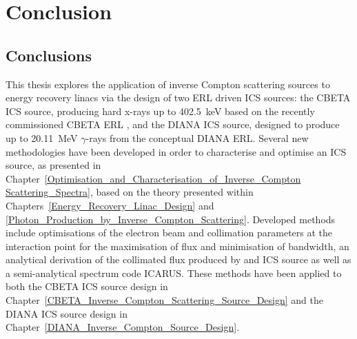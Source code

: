 \documentclass[../main.tex]{subfiles}
\begin{document}
\chapter{Conclusion}
\label{Conclusion} %

\section{Conclusions}

This thesis explores the application of inverse Compton scattering sources to energy recovery linacs via the design of two ERL driven ICS sources: the CBETA ICS source, producing hard x-rays up to 402.5~\si{\kilo\electronvolt} based on the recently commissioned CBETA ERL \cite{bartnik2020cbeta}, and the DIANA ICS source, designed to produce up to 20.11~\si{\mega\electronvolt} $\gamma$-rays from the conceptual DIANA ERL. Several new methodologies have been developed in order to characterise and optimise an ICS source, as presented in Chapter~\ref{Optimisation_and_Characterisation_of_Inverse_Compton Scattering_Spectra}, based on the theory presented within Chapters~\ref{Energy_Recovery_Linac_Design} and \ref{Photon_Production_by_Inverse_Compton_Scattering}. Developed methods include optimisations of the electron beam and collimation parameters at the interaction point for the maximisation of flux and minimisation of bandwidth, an analytical derivation of the collimated flux produced by and ICS source as well as a semi-analytical spectrum code \textsc{ICARUS}. These methods have been applied to both the CBETA ICS source design in Chapter~\ref{CBETA_Inverse_Compton_Scattering_Source_Design} and the DIANA ICS source design in Chapter~\ref{DIANA_Inverse_Compton_Source_Design}.
\end{document}
